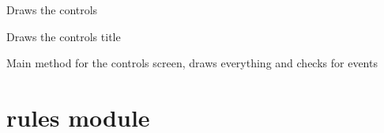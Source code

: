 \documentclass[letterpaper,10pt,english]{sphinxmanual}
\begin{document}
\begin{fulllineitems}
\begin{fulllineitems}
\end{fulllineitems}


\begin{fulllineitems}
\label{\detokenize{controls:controls.Controls.draw_controls}}
\pysigstartsignatures
{}
\pysigstopsignatures
\sphinxAtStartPar
Draws the controls

\end{fulllineitems}


\begin{fulllineitems}
\label{\detokenize{controls:controls.Controls.draw_title}}
\pysigstartsignatures
{}
\pysigstopsignatures
\sphinxAtStartPar
Draws the controls title

\end{fulllineitems}


\begin{fulllineitems}
\label{\detokenize{controls:controls.Controls.main}}
\pysigstartsignatures
{}
\pysigstopsignatures
\sphinxAtStartPar
Main method for the controls screen, draws everything and checks for events

\end{fulllineitems}


\end{fulllineitems}


\sphinxstepscope


\chapter{rules module}
\label{\detokenize{rules:module-rules}}\label{\detokenize{rules:rules-module}}\label{\detokenize{rules::doc}}
\end{document}
